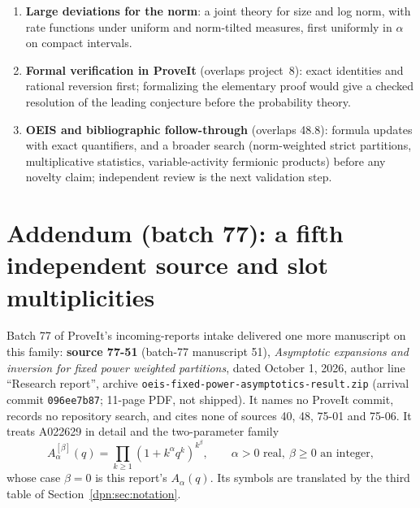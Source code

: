 \documentclass[11pt]{article}
\numberwithin{equation}{section}
\theoremstyle{definition}\newtheorem{definition}[theorem]{Definition}
\theoremstyle{remark}\newtheorem{remark}[theorem]{Remark}
\newcommand{\file}[1]{\nolinkurl{#1}}
\begin{document}
\begin{enumerate}[label=\textbf{75-06.\arabic*}, leftmargin=*]
  log-concavity, ratio monotonicity, higher finite-difference inequalities.
  \textit{[Batch 75, 2 October 2026.]} Eventual strict log-concavity and
  fixed-degree Jensen hyperbolicity are proved for $\mu=1$ by source 75-01
  (Theorems~\ref{dpn:jh:thm:concavity} and~\ref{dpn:jh:thm:jensen}); the rest
  stays open.
\item \textbf{Large deviations for the norm}: a joint theory for size and log
  norm, with rate functions under uniform and norm-tilted measures, first
  uniformly in $\alpha$ on compact intervals.
\item \textbf{Formal verification in ProveIt} (overlaps project~8): exact
  identities and rational reversion first; formalizing the elementary proof
  would give a checked resolution of the leading conjecture before the
  probability theory.
\item \textbf{OEIS and bibliographic follow-through} (overlaps 48.8): formula
  updates with exact quantifiers, and a broader search (norm-weighted strict
  partitions, multiplicative statistics, variable-activity fermionic products)
  before any novelty claim; independent review is the next validation step.
\end{enumerate}

\section{Addendum (batch 77): a fifth independent source and slot multiplicities}\label{dpn:fp:sec:b77}
Batch 77 of ProveIt's incoming-reports intake delivered one more manuscript on
this family: \textbf{source 77-51} (batch-77 manuscript 51),
\emph{Asymptotic expansions and inversion for fixed power weighted
partitions}, dated October 1, 2026, author line ``Research report'', archive
\file{oeis-fixed-power-asymptotics-result.zip} (arrival commit
\texttt{096ee7b87}; 11-page PDF, not shipped).  It names no ProveIt commit,
records no repository search, and cites none of sources 40, 48, 75-01 and
75-06.  It treats A022629 in detail and the two-parameter family
\[
 A^{[\beta]}_\alpha(q)=\prod_{k\ge1}(1+k^\alpha q^k)^{k^\beta},
 \qquad\alpha>0\text{ real},\ \beta\ge0\text{ an integer},
\]
whose case $\beta=0$ is this report's $A_\alpha(q)$.  Its symbols are
translated by the third table of Section~\ref{dpn:sec:notation}.
\end{document}
